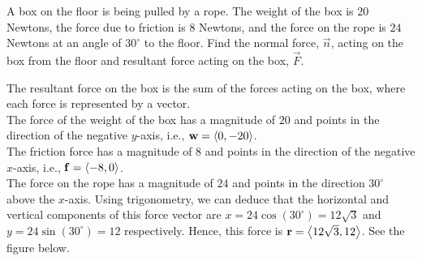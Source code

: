 \documentclass[handout]{ximera}
\begin{document}
\begin{example}[Example 6]
A box on the floor is being pulled by a rope. The weight of the box is $20$ Newtons, the force due to friction is $8$ Newtons, and the 
force on the rope is $24$ Newtons at an angle of $30^\circ$ to the floor. Find the normal force, $\vec{n}$, acting on the box from the 
floor and resultant force acting on the box, $\vec{F}$.\\
\begin{image}  
\end{image}


The resultant force on the box is the sum of the forces acting on the box, where each force is represented by a vector.\\
The force of the weight of the box has a magnitude of $20$ and points in the direction of the negative $y$-axis, i.e., $\mathbf{w} = \left\langle 0,-20\right\rangle$.\\
The friction force has a magnitude of $8$ and points in the direction of the negative $x$-axis, i.e., $\mathbf{f} = \left\langle -8,0\right\rangle$.\\
The force on the rope has a magnitude of $24$ and points in the direction $30^\circ$ above the $x$-axis. 
Using trigonometry, we can deduce that the horizontal and vertical components of this force vector are $x = 24\cos(30^\circ) = 12\sqrt 3$
and $y = 24\sin(30^\circ) = 12$ respectively. Hence, this force is $\mathbf r = \left\langle 12\sqrt 3, 12\right\rangle$.  See the figure below.

\begin{image}
\end{image}


\end{example}
\end{document}
